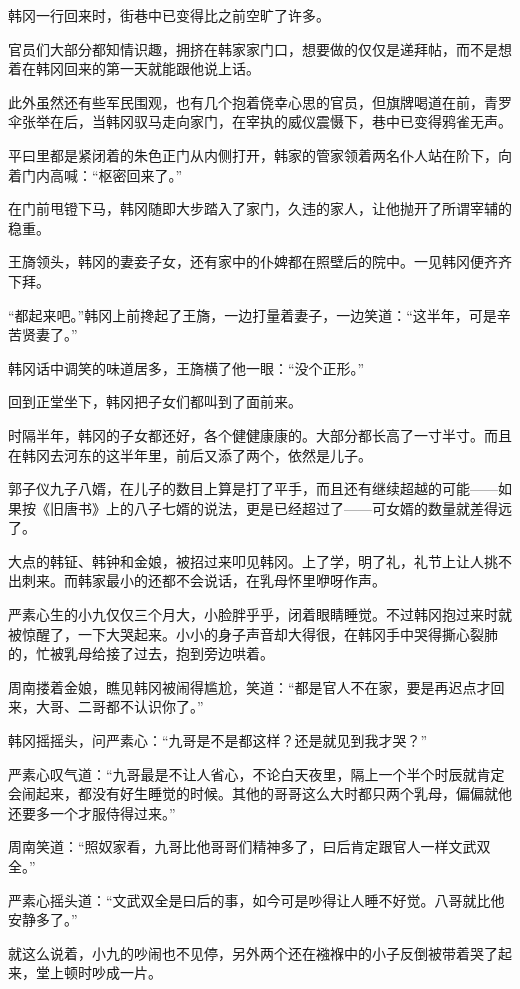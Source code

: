 韩冈一行回来时，街巷中已变得比之前空旷了许多。

官员们大部分都知情识趣，拥挤在韩家家门口，想要做的仅仅是递拜帖，而不是想着在韩冈回来的第一天就能跟他说上话。

此外虽然还有些军民围观，也有几个抱着侥幸心思的官员，但旗牌喝道在前，青罗伞张举在后，当韩冈驭马走向家门，在宰执的威仪震慑下，巷中已变得鸦雀无声。

平曰里都是紧闭着的朱色正门从内侧打开，韩家的管家领着两名仆人站在阶下，向着门内高喊：“枢密回来了。”

在门前甩镫下马，韩冈随即大步踏入了家门，久违的家人，让他抛开了所谓宰辅的稳重。

王旖领头，韩冈的妻妾子女，还有家中的仆婢都在照壁后的院中。一见韩冈便齐齐下拜。

“都起来吧。”韩冈上前搀起了王旖，一边打量着妻子，一边笑道：“这半年，可是辛苦贤妻了。”

韩冈话中调笑的味道居多，王旖横了他一眼：“没个正形。”

回到正堂坐下，韩冈把子女们都叫到了面前来。

时隔半年，韩冈的子女都还好，各个健健康康的。大部分都长高了一寸半寸。而且在韩冈去河东的这半年里，前后又添了两个，依然是儿子。

郭子仪九子八婿，在儿子的数目上算是打了平手，而且还有继续超越的可能——如果按《旧唐书》上的八子七婿的说法，更是已经超过了——可女婿的数量就差得远了。

大点的韩钲、韩钟和金娘，被招过来叩见韩冈。上了学，明了礼，礼节上让人挑不出刺来。而韩家最小的还都不会说话，在乳母怀里咿呀作声。

严素心生的小九仅仅三个月大，小脸胖乎乎，闭着眼睛睡觉。不过韩冈抱过来时就被惊醒了，一下大哭起来。小小的身子声音却大得很，在韩冈手中哭得撕心裂肺的，忙被乳母给接了过去，抱到旁边哄着。

周南搂着金娘，瞧见韩冈被闹得尴尬，笑道：“都是官人不在家，要是再迟点才回来，大哥、二哥都不认识你了。”

韩冈摇摇头，问严素心：“九哥是不是都这样？还是就见到我才哭？”

严素心叹气道：“九哥最是不让人省心，不论白天夜里，隔上一个半个时辰就肯定会闹起来，都没有好生睡觉的时候。其他的哥哥这么大时都只两个乳母，偏偏就他还要多一个才服侍得过来。”

周南笑道：“照奴家看，九哥比他哥哥们精神多了，曰后肯定跟官人一样文武双全。”

严素心摇头道：“文武双全是曰后的事，如今可是吵得让人睡不好觉。八哥就比他安静多了。”

就这么说着，小九的吵闹也不见停，另外两个还在襁褓中的小子反倒被带着哭了起来，堂上顿时吵成一片。

